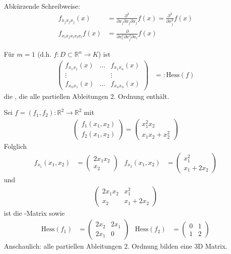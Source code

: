 Abkürzende Schreibweise: \begin{align*}
	f_{x_j x_j x_j}(x) &= \frac{\partial^3}{\partial x_j \partial x_j \partial x_j} f(x) = \frac{\partial^3}{\partial x_j^3} f(x) \\
	f_{x_i x_j x_i x_l x_l}f(x) &= \frac{\partial}{\partial x_l^2 \partial x_j^2 \partial x_i} f(x)
\end{align*}
\begin{*definition}
Für $m=1$ (d.h. $f:D\subset\mathbb{R}^n\to K$) ist 
\begin{align*}
	\begin{pmatrix}
		f_{x_1 x_1}(x) & \dotsc & f_{x_1 x_n}(x) \\
		\vdots & & \vdots \\
		f_{x_n x_1}(x) & \dotsc & f_{x_n x_n}(x)
	\end{pmatrix} &=: \mathrm{Hess}(f)
\end{align*}
die , die alle partiellen Ableitungen 2. Ordnung enthält.
\end{*definition}

\begin{example}
	Sei $f=(f_1, f_2): \mathbb{R}^2\to\mathbb{R}^2$ mit \begin{align*}
		\begin{pmatrix}
			f_1(x_1, x_2) \\ f_2(x_1, x_2)
		\end{pmatrix} = \begin{pmatrix}
			x_1^2 x_2 \\ x_1 x_2 + x_2^2
		\end{pmatrix}
	\end{align*}
	Folglich \begin{align*}
		f_{x_1}(x_1, x_2) &= \begin{pmatrix}
			2 x_1 x_2 \\ x_2
		\end{pmatrix} & f_{x_2}(x_1, x_2) &= \begin{pmatrix}
			x_1^2 \\ x_1 + 2 x_2
		\end{pmatrix}
	\end{align*}
	und \begin{align*}
		\begin{pmatrix}
			2 x_1 x_2 & x_1^2 \\ x_2 & x_1 + 2x_2
		\end{pmatrix}
	\end{align*}
	ist die -Matrix sowie
	\begin{align*}
		\textrm{Hess}(f_1) &= \begin{pmatrix}
			2 x_2 & 2 x_1 \\ 2x_1  & 0
		\end{pmatrix} & \textrm{Hess}(f_2) &= \begin{pmatrix}
			0 & 1 \\ 1 & 2
		\end{pmatrix}
	\end{align*}
	Anschaulich: alle partiellen Ableitungen 2. Ordnung bilden eine 3D Matrix.
\end{example}

